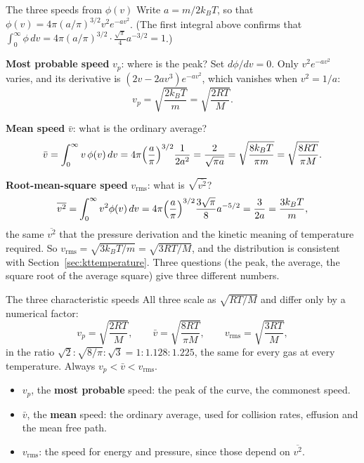 \begin{derivbox}{The three speeds from $\phi(v)$}
Write $a=m/2k_BT$, so that $\phi(v)=4\pi(a/\pi)^{3/2}v^2e^{-av^2}$. (The first integral above confirms
that $\int_0^\infty\phi\,dv=4\pi(a/\pi)^{3/2}\cdot\frac{\sqrt\pi}{4}a^{-3/2}=1$.)

 \textbf{Most probable speed} $v_p$: where is the peak? Set $d\phi/dv=0$. Only $v^2e^{-av^2}$
varies, and its derivative is $(2v-2av^3)e^{-av^2}$, which vanishes when $v^2=1/a$:
\[ v_p = \sqrt{\frac{2k_BT}{m}} = \sqrt{\frac{2RT}{M}}. \]

 \textbf{Mean speed} $\bar v$: what is the ordinary average?
\[
\bar v = \int_0^\infty v\,\phi(v)\,dv = 4\pi\Bigl(\frac{a}{\pi}\Bigr)^{3/2}\frac{1}{2a^2}
=\frac{2}{\sqrt{\pi a}}
=\sqrt{\frac{8k_BT}{\pi m}} = \sqrt{\frac{8RT}{\pi M}}.
\]

 \textbf{Root-mean-square speed} $v_{\text{rms}}$: what is $\sqrt{\overline{v^2}}$?
\[
\overline{v^2} = \int_0^\infty v^2 \phi(v)\,dv = 4\pi\Bigl(\frac{a}{\pi}\Bigr)^{3/2}\frac{3\sqrt\pi}{8}a^{-5/2}
=\frac{3}{2a}=\frac{3k_BT}{m},
\]
the same $\overline{v^2}$ that the pressure derivation and the kinetic meaning of temperature required.
So $v_{\text{rms}} = \sqrt{3k_BT/m} = \sqrt{3RT/M}$, and the distribution is consistent with
Section~\ref{sec:kttemperature}. Three questions (the peak, the average, the square root of the average
square) give three different numbers.
\end{derivbox}

\begin{keybox}{The three characteristic speeds}
All three scale as $\sqrt{RT/M}$ and differ only by a numerical factor:
\[
v_p = \sqrt{\frac{2RT}{M}}, \qquad
\bar v = \sqrt{\frac{8RT}{\pi M}}, \qquad
v_{\text{rms}} = \sqrt{\frac{3RT}{M}},
\]
in the ratio $\sqrt2 : \sqrt{8/\pi} : \sqrt3 = 1 : 1.128 : 1.225$, the same for every gas at every
temperature. Always $v_p < \bar v < v_{\text{rms}}$.
\begin{itemize}
\item $v_p$, the \textbf{most probable} speed: the peak of the curve, the commonest speed.
\item $\bar v$, the \textbf{mean} speed: the ordinary average, used for collision rates, effusion and the
      mean free path.
\item $v_{\text{rms}}$: the speed for energy and pressure, since those depend on $\overline{v^2}$.
\end{itemize}
\end{keybox}


